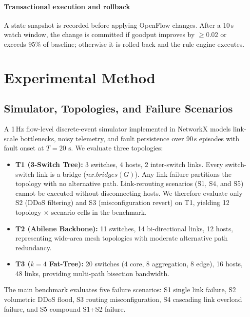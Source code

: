 \documentclass[sn-mathphys,Numbered]{sn-jnl}
\begin{document}
\paragraph{Transactional execution and rollback} A state snapshot is recorded before applying OpenFlow changes. After a 10\,s watch window, the change is committed if goodput improves by $\ge0.02$ or exceeds 95\% of baseline; otherwise it is rolled back and the rule engine executes.

\FloatBarrier
\section{Experimental Method}\label{sec:method}
\subsection{Simulator, Topologies, and Failure Scenarios}
A 1\,Hz flow-level discrete-event simulator implemented in NetworkX models link-scale bottlenecks, noisy telemetry, and fault persistence over 90\,s episodes with fault onset at $T=20\text{ s}$. We evaluate three topologies:
\begin{itemize}
\item \textbf{T1 (3-Switch Tree):} 3 switches, 4 hosts, 2 inter-switch links. Every switch-switch link is a bridge ($nx.bridges(G)$). Any link failure partitions the topology with no alternative path. Link-rerouting scenarios (S1, S4, and S5) cannot be executed without disconnecting hosts. We therefore evaluate only S2 (DDoS filtering) and S3 (misconfiguration revert) on T1, yielding 12 topology $\times$ scenario cells in the benchmark.
\item \textbf{T2 (Abilene Backbone):} 11 switches, 14 bi-directional links, 12 hosts, representing wide-area mesh topologies with moderate alternative path redundancy.
\item \textbf{T3 ($k{=}4$ Fat-Tree):} 20 switches (4 core, 8 aggregation, 8 edge), 16 hosts, 48 links, providing multi-path bisection bandwidth.
\end{itemize}

The main benchmark evaluates five failure scenarios: S1 single link failure, S2 volumetric DDoS flood, S3 routing misconfiguration, S4 cascading link overload failure, and S5 compound S1+S2 failure.
\end{document}
